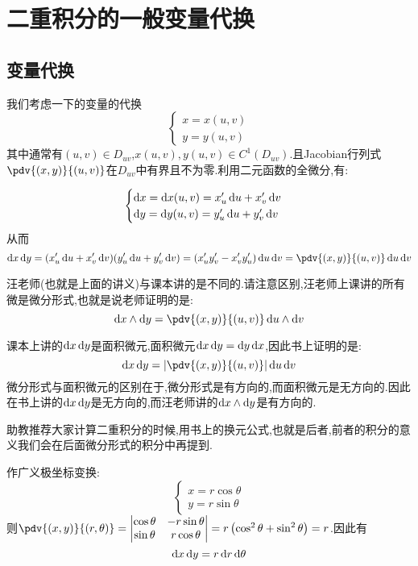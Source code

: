 \setcounter{chapter}{19} %

\chapter{二重积分的一般变量代换}

\section{变量代换}

我们考虑一下的变量的代换
$$
\begin{cases}
    x = x(u,v)\\
    y = y(u,v)
\end{cases}
$$
其中通常有$(u,v) \in D_{uv}$,$x(u,v),y(u,v) \in C^1(D_{uv})$.且Jacobian行列式$\pdv{(x,y)}{(u,v)}$在$D_{uv}$中有界且不为零.利用二元函数的全微分,有:

$$
\begin{cases}
    \dif x = \dif x(u,v) = x_u' \dif u + x_v' \dif v\\
    \dif y = \dif y(u,v) = y_u' \dif u + y_v' \dif v
\end{cases}
$$
从而
$$\dif x \dif y = (x_u' \dif u + x_v' \dif v)(y_u' \dif u + y_v' \dif v) = (x_u'y_v' - x_v'y_u') \dif u \dif v =\pdv{(x,y)}{(u,v)} \dif u \dif v$$

\begin{remark}
    汪老师(也就是上面的讲义)与课本讲的是不同的.请注意区别,汪老师上课讲的所有微是微分形式,也就是说老师证明的是:
    $$\dif x \wedge \dif y = \pdv{(x,y)}{(u,v)} \dif u \wedge \dif v$$

    课本上讲的$\operatorname{d\!} x \operatorname{d\!} y$是面积微元,面积微元$\operatorname{d\!} x \operatorname{d\!} y = \operatorname{d\!} y \operatorname{d\!} x$,因此书上证明的是:
    $$\dif x \dif y = \left| \pdv{(x,y)}{(u,v)} \right| \dif u \dif v$$
    微分形式与面积微元的区别在于,微分形式是有方向的,而面积微元是无方向的.因此在书上讲的$\operatorname{d\!} x \operatorname{d\!} y$是无方向的,而汪老师讲的$\operatorname{d\!} x \wedge \operatorname{d\!} y$是有方向的.

    助教推荐大家计算二重积分的时候,用书上的换元公式,也就是后者,前者的积分的意义我们会在后面微分形式的积分中再提到.
\end{remark}

\begin{example}
    作广义极坐标变换:
    $$
    \begin{cases}
        x = r \cos \theta\\
        y = r \sin \theta
    \end{cases}
$$
则$\pdv{(x,y)}{(r,\theta)} = \begin{vmatrix}
    \cos \theta & -r \sin \theta\\
    \sin \theta & r \cos \theta
\end{vmatrix} = r \left( \cos^2 \theta + \sin^2 \theta \right) = r$.因此有
$$\operatorname{d\!} x \operatorname{d\!} y = r \operatorname{d\!} r \operatorname{d\!} \theta$$
\end{example}


